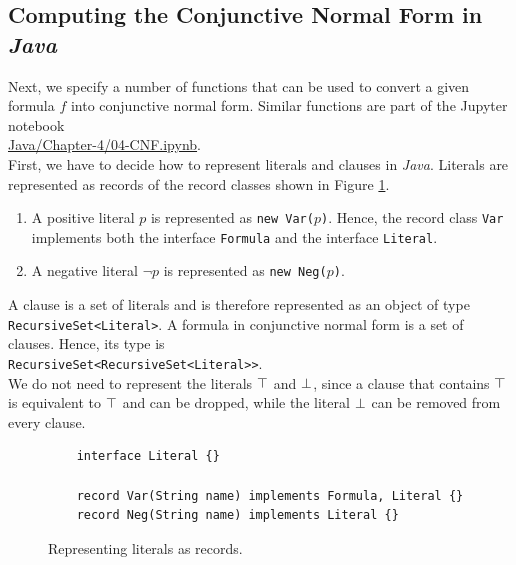 \subsection{Computing the Conjunctive Normal Form in \textsl{Java}}
Next, we specify a number of functions that can be used to convert a given 
formula $f$ into conjunctive normal form.  Similar functions are part of the Jupyter notebook
\\[0.2cm]
\hspace*{1.3cm}
\href{https://github.com/karlstroetmann/Logic/blob/master/Java/Chapter-4/04-CNF.ipynb}{Java/Chapter-4/04-CNF.ipynb}.
\\[0.2cm]
First, we have to decide how to represent literals and clauses in \textsl{Java}.  
Literals are represented as records of the record classes shown in Figure \ref{fig:literal-records}.
\begin{enumerate}
\item A positive literal $p$ is represented as \texttt{new Var($p$)}.  Hence, the record
      class \texttt{Var} implements both the interface \texttt{Formula} and the interface \texttt{Literal}.
\item A negative literal $\neg p$ is represented as \texttt{new Neg($p$)}.
\end{enumerate}
A clause is a set of literals and is therefore represented as an object of type
\texttt{RecursiveSet<Literal>}.  A formula in conjunctive normal form is a set of clauses.  Hence, its type is
\\[0.2cm]
\hspace*{1.3cm}
\texttt{RecursiveSet<RecursiveSet<Literal>{}>}.
\\[0.2cm]
We do not need to represent the literals $\top$ and
$\bot$, since a clause that contains $\top$ is equivalent to $\top$ and can be dropped, while the literal
$\bot$ can be removed from every clause.

\begin{figure}[!ht]
  \centering
\begin{verbatim}
    interface Literal {}

    record Var(String name) implements Formula, Literal {}
    record Neg(String name) implements Literal {}
\end{verbatim}
\vspace*{-0.3cm}
  \caption{Representing literals as records.}
  \label{fig:literal-records}
\end{figure} 

